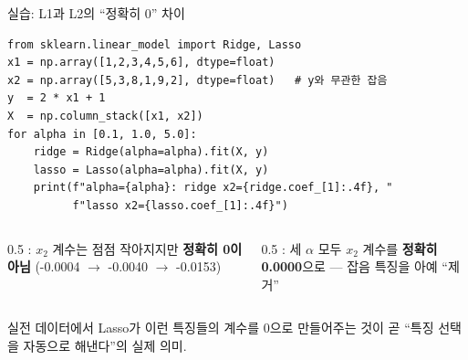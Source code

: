 \documentclass[aspectratio=169,11pt]{beamer}
\begin{document}

\begin{frame}[fragile]{실습: L1과 L2의 ``정확히 0'' 차이}
  \small
\begin{lstlisting}
from sklearn.linear_model import Ridge, Lasso
x1 = np.array([1,2,3,4,5,6], dtype=float)
x2 = np.array([5,3,8,1,9,2], dtype=float)   # y와 무관한 잡음
y  = 2 * x1 + 1
X  = np.column_stack([x1, x2])
for alpha in [0.1, 1.0, 5.0]:
    ridge = Ridge(alpha=alpha).fit(X, y)
    lasso = Lasso(alpha=alpha).fit(X, y)
    print(f"alpha={alpha}: ridge x2={ridge.coef_[1]:.4f}, "
          f"lasso x2={lasso.coef_[1]:.4f}")
\end{lstlisting}
\begin{columns}[T]
  \begin{column}{0.5\textwidth}
    : $x_2$ 계수는 점점 작아지지만
    \textbf{정확히 0이 아님}
    (-0.0004 $\to$ -0.0040 $\to$ -0.0153)
  \end{column}
  \begin{column}{0.5\textwidth}
    : 세 $\alpha$ 모두 $x_2$ 계수를 \textbf{정확히
    0.0000}으로 — 잡음 특징을 아예 ``제거''
  \end{column}
\end{columns}
  {\footnotesize 실전 데이터에서 Lasso가 이런 특징들의 계수를 0으로
  만들어주는 것이 곧 ``특징 선택을 자동으로 해낸다''의 실제 의미.}
\end{frame}
\end{document}
